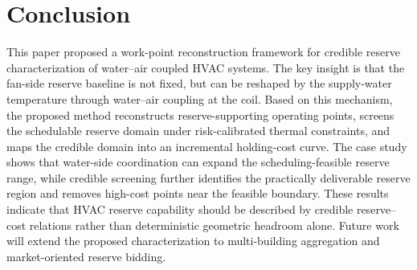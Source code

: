 \documentclass[journal]{IEEEtran}
\theoremstyle{remark}
\begin{document}
	
	
	
	
	\section{Conclusion}
	\label{sec:conclusion}
	
	This paper proposed a work-point reconstruction framework for credible reserve characterization of water--air coupled HVAC systems. The key insight is that the fan-side reserve baseline is not fixed, but can be reshaped by the supply-water temperature through water--air coupling at the coil. Based on this mechanism, the proposed method reconstructs reserve-supporting operating points, screens the schedulable reserve domain under risk-calibrated thermal constraints, and maps the credible domain into an incremental holding-cost curve. The case study shows that water-side coordination can expand the scheduling-feasible reserve range, while credible screening further identifies the practically deliverable reserve region and removes high-cost points near the feasible boundary. These results indicate that HVAC reserve capability should be described by credible reserve--cost relations rather than deterministic geometric headroom alone. Future work will extend the proposed characterization to multi-building aggregation and market-oriented reserve bidding.
	
\end{document}
